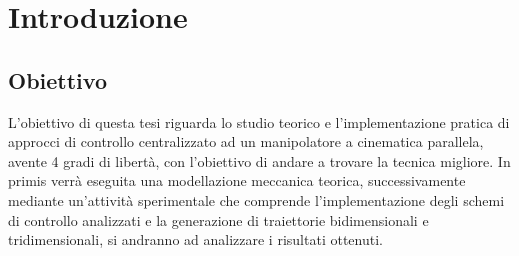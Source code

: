 \section{Introduzione}

\subsection{Obiettivo}
L'obiettivo di questa tesi riguarda lo studio teorico e l'implementazione pratica di approcci di controllo centralizzato ad un manipolatore a cinematica parallela, avente 4 gradi di libertà, con l'obiettivo di andare a trovare la tecnica migliore. In primis verrà eseguita una modellazione meccanica teorica, successivamente mediante un'attività sperimentale che comprende l'implementazione degli schemi di controllo analizzati e la generazione di traiettorie bidimensionali e tridimensionali, si andranno ad analizzare i risultati ottenuti.
